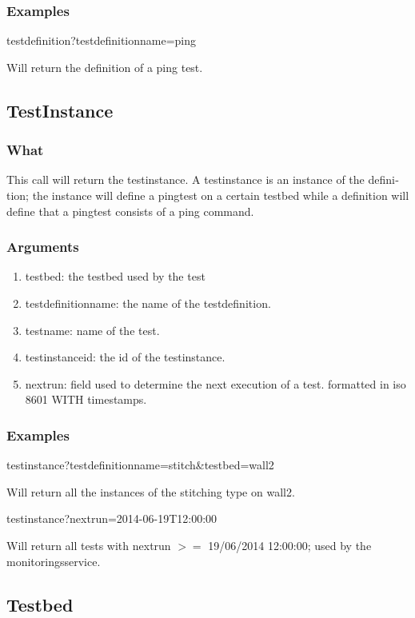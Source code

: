 \begin{otherlanguage}{english}
\subsubsection{Examples}
\begin{lt}
testdefinition?testdefinitionname=ping
\end{lt}
Will return the definition of a ping test.
\\
\subsection{TestInstance}
\subsubsection{What}
This call will return the testinstance. A testinstance is an instance of the definition; the instance will define a pingtest on a certain testbed while a definition will define that a pingtest consists of a ping command. 
\subsubsection{Arguments}
\begin{enumerate}
\item testbed: the testbed used by the test
\item testdefinitionname: the name of the testdefinition.
\item testname: name of the test.
\item testinstanceid: the id of the testinstance.
\item nextrun: field used to determine the next execution of a test. formatted in iso 8601 WITH timestamps.
\end{enumerate}
\clearpage
\subsubsection{Examples}
\begin{lt}
testinstance?testdefinitionname=stitch\&testbed=wall2
\end{lt}
Will return all the instances of the stitching type on wall2.
\begin{lt}
testinstance?nextrun=2014-06-19T12:00:00
\end{lt}
Will return all tests with nextrun $>=$ 19/06/2014 12:00:00; used by the monitoringsservice.\\

\subsection{Testbed}

\end{otherlanguage}
